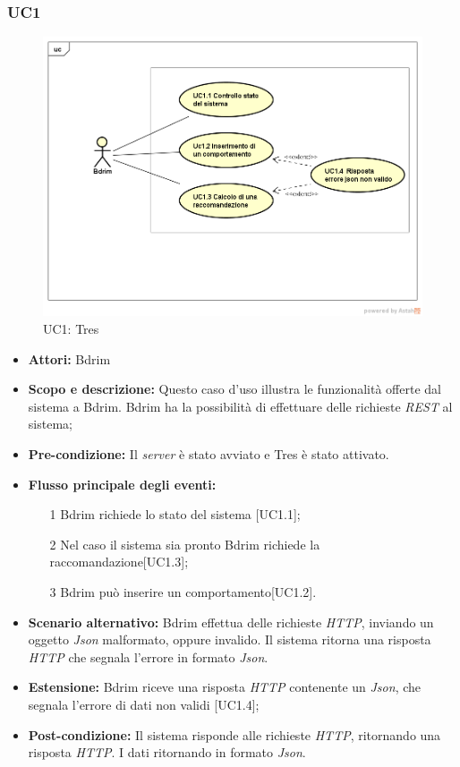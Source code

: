 \subsubsection{UC1}
\begin{figure}[h]
\centering
\includegraphics[scale=0.42]{immagini/UC1a}
\caption{UC1: Tres}
\label{fig:UC1}
\end{figure}
\begin{itemize}
\item \textbf{Attori:} Bdrim
\item \textbf{Scopo e descrizione:} Questo caso d'uso illustra le funzionalità offerte dal sistema a Bdrim. Bdrim ha la possibilità di effettuare delle richieste \emph{REST} al sistema;
\item \textbf{Pre-condizione:} Il \emph{server} è stato avviato e Tres è stato attivato.
\item \textbf{Flusso principale degli eventi:}
\begin{itemize}
\item[1] Bdrim richiede lo stato del sistema [UC1.1];
\item[2] Nel caso il sistema sia pronto Bdrim richiede la raccomandazione[UC1.3];
\item[3] Bdrim può inserire un comportamento[UC1.2].
\end{itemize}
\item \textbf{Scenario alternativo:} Bdrim effettua delle richieste \emph{HTTP}, inviando un oggetto \emph{Json} malformato, oppure invalido. Il sistema ritorna una risposta \emph{HTTP} che segnala l'errore in formato \emph{Json}. 
\item \textbf{Estensione:} Bdrim riceve una risposta \emph{HTTP} contenente un \emph{Json}, che segnala l'errore di dati non validi [UC1.4];
\item \textbf{Post-condizione:} Il sistema risponde alle richieste \emph{HTTP}, ritornando una risposta \emph{HTTP}. I dati ritornando in formato \emph{Json}.
\end{itemize}




